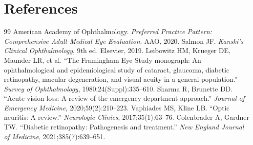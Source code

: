 \section*{References}
\begin{thebibliography}{99}
 American Academy of Ophthalmology. \textit{Preferred Practice Pattern: Comprehensive Adult Medical Eye Evaluation}. AAO, 2020.
 Salmon JF. \textit{Kanski's Clinical Ophthalmology}, 9th ed. Elsevier, 2019.
 Leibowitz HM, Krueger DE, Maunder LR, et al. ``The Framingham Eye Study monograph: An ophthalmological and epidemiological study of cataract, glaucoma, diabetic retinopathy, macular degeneration, and visual acuity in a general population.'' \textit{Survey of Ophthalmology}, 1980;24(Suppl):335--610.
 Sharma R, Brunette DD. ``Acute vision loss: A review of the emergency department approach.'' \textit{Journal of Emergency Medicine}, 2020;59(2):210--223.
 Vaphiades MS, Kline LB. ``Optic neuritis: A review.'' \textit{Neurologic Clinics}, 2017;35(1):63--76.
 Colenbrader A, Gardner TW. ``Diabetic retinopathy: Pathogenesis and treatment.'' \textit{New England Journal of Medicine}, 2021;385(7):639--651.
\end{thebibliography}
